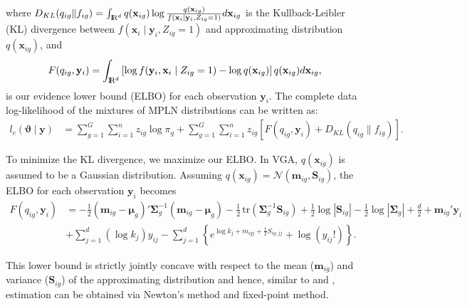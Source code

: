 \documentclass[12pt]{article}
\newcommand{\real}{\text{\rm I\hspace{-0.6mm}R}}
\newcommand{\bmm}{\mathbf{m}}
\newcommand{\bx}{\mathbf{x}}
\newcommand{\by}{\mathbf{y}}
\newcommand{\bmu}{\boldsymbol{\mu}}
\newcommand{\bSigma}{\boldsymbol{\Sigma}}
\newcommand{\tr}{\,\mbox{tr}}
\begin{document}
\noindent where $D_{KL}(q_{ig}\|f_{ig})= \int_{\real^d} q(\bx_{ig}) \log \frac{q(\bx_{ig})}{f(\bx_{i}\mid\by_i,Z_{ig}=1)} d\bx_{ig}$ is the Kullback-Leibler (KL) divergence between $f(\bx_{i}\mid \by_i,Z_{ig}=1)$ and approximating distribution $q(\bx_{ig})$, and 
$$F(q_{ig},\by_i)=\int_{\real^d} \left[\log f(\by_i,\bx_i\mid Z_{ig}=1) - \log q(\bx_{ig})\right] q(\bx_{ig})  d\bx_{ig},$$ is our evidence lower bound (ELBO) for each observation $\by_i$. 
\noindent The complete data log-likelihood of the mixtures of MPLN distributions can be written as:
\begin{align*}
l_c(\boldsymbol{\vartheta}\mid \by) &= \sum_{g=1}^G \sum_{i=1}^n z_{ig} \log \pi_g +  \sum_{g=1}^G \sum_{i=1}^n z_{ig} \left[ F(q_{ig},\by_i) + D_{KL}(q_{ig}\|f_{ig}) \right].
\end{align*}

\noindent To minimize the KL divergence, we maximize our ELBO. In VGA, $q(\bx_{ig})$ is assumed to be a Gaussian distribution. Assuming $q(\bx_{ig}) = \mathscr{N}(\mathbf{m}_{ig}, \mathbf{S}_{ig})$, the ELBO for each observation $\by_i$ becomes
\begin{align*}
F(q_{ig},\by_i) &=-\frac{1}{2}(\bmm_{ig}-\bmu_g)'\bSigma_g^{-1}(\bmm_{ig}-\bmu_g)-\frac{1}{2} \tr(\bSigma_g^{-1}\mathbf{S}_{ig})+\frac{1}{2} \log |\mathbf{S}_{ig}| -\frac{1}{2} \log |\bSigma_g| + \frac{d}{2}+ \bmm_{ig}'\by_i \\
&+\sum_{j=1}^d\left(\log k_j\right)y_{ij}-   \sum_{j=1}^d \left\{e^{\log k_j+m_{igj}+\frac{1}{2}S_{ig,jj}}+\log(y_{ij}!)\right\}.
\end{align*}

This lower bound is strictly jointly concave with respect to the mean ($\bmm_{ig}$) and variance ($\mathbf{S}_{ig}$) of the approximating distribution and hence, similar to \cite{arridge2018} and \cite{subedi2020parsimonious}, estimation can be obtained via Newton's method and fixed-point method.
  
\end{document}
